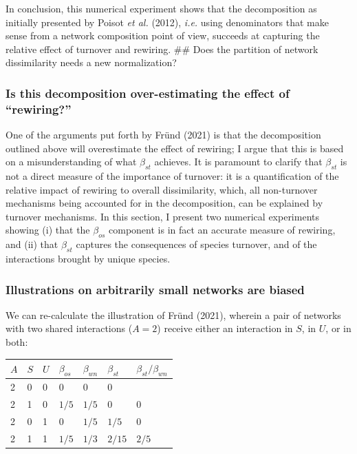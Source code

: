 \documentclass[11pt]{article}
\begin{document}
In conclusion, this numerical experiment shows that the decomposition as
initially presented by Poisot \emph{et al.} (2012), \emph{i.e.} using
denominators that make sense from a network composition point of view,
succeeds at capturing the relative effect of turnover and rewiring. \#\#
Does the partition of network dissimilarity needs a new normalization?

\hypertarget{is-this-decomposition-over-estimating-the-effect-of-rewiring}{%
\subsubsection{Is this decomposition over-estimating the effect of
``rewiring?''}\label{is-this-decomposition-over-estimating-the-effect-of-rewiring}}

One of the arguments put forth by Fründ (2021) is that the decomposition
outlined above will overestimate the effect of rewiring; I argue that
this is based on a misunderstanding of what \(\beta_{st}\) achieves. It
is paramount to clarify that \(\beta_{st}\) is not a direct measure of
the importance of turnover: it is a quantification of the relative
impact of rewiring to overall dissimilarity, which, all non-turnover
mechanisms being accounted for in the decomposition, can be explained by
turnover mechanisms. In this section, I present two numerical
experiments showing (i) that the \(\beta_{os}\) component is in fact an
accurate measure of rewiring, and (ii) that \(\beta_{st}\) captures the
consequences of species turnover, and of the interactions brought by
unique species.

\hypertarget{illustrations-on-arbitrarily-small-networks-are-biased}{%
\subsubsection{Illustrations on arbitrarily small networks are
biased}\label{illustrations-on-arbitrarily-small-networks-are-biased}}

We can re-calculate the illustration of Fründ (2021), wherein a pair of
networks with two shared interactions (\(A = 2\)) receive either an
interaction in \(S\), in \(U\), or in both:

\begin{longtable}[]{@{}lllllll@{}}
\toprule
\(A\) & \(S\) & \(U\) & \(\beta_{os}\) & \(\beta_{wn}\) & \(\beta_{st}\)
& \(\beta_{st}/\beta_{wn}\)\tabularnewline
\midrule
\endhead
2 & 0 & 0 & 0 & 0 & 0 &\tabularnewline
2 & 1 & 0 & \(1/5\) & \(1/5\) & 0 & 0\tabularnewline
2 & 0 & 1 & 0 & \(1/5\) & \(1/5\) & 0\tabularnewline
2 & 1 & 1 & \(1/5\) & \(1/3\) & \(2/15\) & \(2/5\)\tabularnewline
\bottomrule
\end{longtable}
\end{document}
